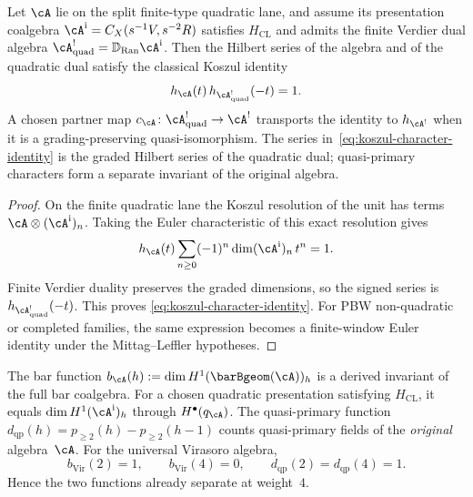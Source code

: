 \begin{proposition}
\label{prop:koszul-character-identity}

Let $\cA$ lie on the split finite-type quadratic lane, and assume its
presentation coalgebra
$\cA^{\mathrm i}=C_X(s^{-1}V,s^{-2}R)$ satisfies
$H_{\mathrm{CL}}$ and admits the finite Verdier dual algebra
$\cA^!_{\mathrm{quad}}=\mathbb D_{\operatorname{Ran}}
\cA^{\mathrm i}$. Then the Hilbert series of the algebra and of the
quadratic dual satisfy the classical Koszul
identity
\begin{equation}\label{eq:koszul-character-identity}
 h_\cA(t)\,h_{\cA^!_{\mathrm{quad}}}(-t)=1.
\end{equation}
A chosen partner map
$c_\cA\colon\cA^!_{\mathrm{quad}}\to\cA^!$ transports the identity
to $h_{\cA^!}$ when it is a grading-preserving quasi-isomorphism.
The series in~\eqref{eq:koszul-character-identity} is the graded
Hilbert series of the quadratic dual; quasi-primary characters form a
separate invariant of the original algebra.
\end{proposition}

\begin{proof}
On the finite quadratic lane the Koszul resolution of the unit has
terms $\cA\otimes(\cA^{\mathrm i})_n$. Taking the Euler characteristic
of this exact resolution gives
\[
h_\cA(t)\sum_{n\ge0}(-1)^n\dim(\cA^{\mathrm i})_n\,t^n=1.
\]
Finite Verdier duality preserves the graded dimensions, so the signed
series is $h_{\cA^!_{\mathrm{quad}}}(-t)$. This proves
\eqref{eq:koszul-character-identity}. For PBW non-quadratic or
completed families, the same expression becomes a finite-window Euler
identity under the Mittag--Leffler hypotheses.
\end{proof}

\begin{proposition}
\label{prop:bar-neq-quasiprimary}
The bar function
$b_\cA(h):=\dim H^1(\barBgeom(\cA))_h$ is a derived invariant of the
full bar coalgebra.  For a chosen quadratic presentation satisfying
$H_{\mathrm{CL}}$, it equals
$\dim H^1(\cA^{\mathrm i})_h$ through $H^\bullet(q_\cA)$.
The quasi-primary function
$d_{\mathrm{qp}}(h) = p_{\geq 2}(h) - p_{\geq 2}(h-1)$
counts quasi-primary fields of the \emph{original}
algebra~$\cA$.  For the universal Virasoro algebra,
\[
 b_{\mathrm{Vir}}(2)=1,
 \qquad b_{\mathrm{Vir}}(4)=0,
 \qquad d_{\mathrm{qp}}(2)=d_{\mathrm{qp}}(4)=1.
\]
Hence the two functions already separate at weight~$4$.
\end{proposition}

